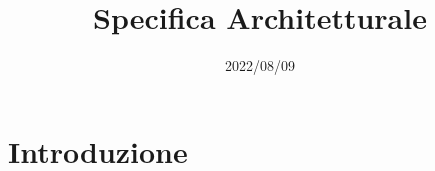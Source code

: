 \documentclass{classes/base}
\title{Specifica Architetturale}
\date{2022/08/09}
\author{}
\begin{document}
	\maketitle
	\newpage
	
	\newpage
	\tableofcontents
	\newpage
	\listoffigures
  
	\newpage
	\section{Introduzione}
	
\end{document}
